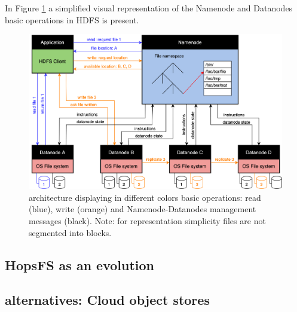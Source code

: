 In Figure \ref{fig:hdfs} a simplified visual representation of the Namenode and Datanodes basic operations in \gls{HDFS} is present.

\begin{figure}[!ht]
    \begin{center}
      \includegraphics[width=\textwidth]{figures/2-background/HDFS.png}
    \end{center}
    \caption{ architecture displaying in different colors basic operations: read (blue), write (orange) and Namenode-Datanodes management messages (black). Note: for representation simplicity files are not segmented into blocks.}
    \label{fig:hdfs}
\end{figure}
 
\subsection{HopsFS as an  evolution}



\subsection{ alternatives: Cloud object stores}